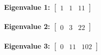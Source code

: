 \paragraph{\textbf{Eigenvalue 1:} $\left[\begin{matrix}
                1 & 1 & 11
            \end{matrix}\right]$}
\paragraph{\textbf{Eigenvalue 2:} $\left[\begin{matrix}
                0 & 3 & 22
            \end{matrix}\right]$}
\paragraph{\textbf{Eigenvalue 3:} $\left[\begin{matrix}
                0 & 11 & 102
            \end{matrix}\right]$}
% 